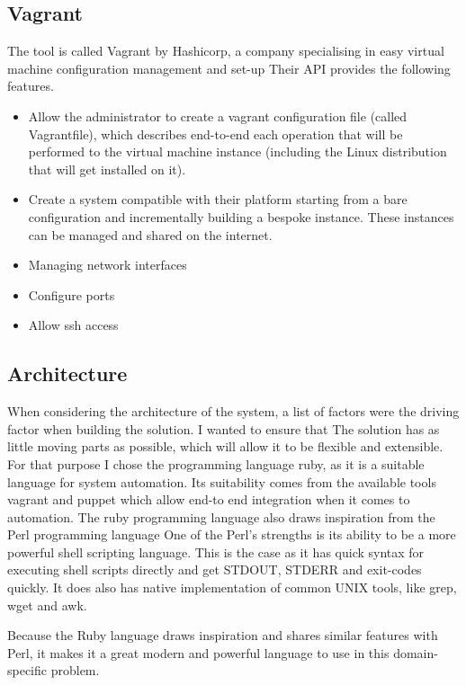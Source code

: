 \documentclass{article}
\begin{document}
\subsection{Vagrant}
The tool is called Vagrant by Hashicorp, a company specialising in easy virtual machine configuration management and set-up Their API provides the following features.

\begin{itemize}
	\item
	      Allow the administrator to create a \gls{vagrant} configuration file (called Vagrantfile), which describes end-to-end each operation that will be performed to the virtual machine instance (including the Linux distribution that will get installed on it).
	\item
	      Create a system compatible with their platform starting from a bare configuration and incrementally building a bespoke instance. These instances can be managed and shared on the internet.
	\item
	      Managing network interfaces
	\item
	      Configure ports
	\item
	      Allow \gls{ssh} access
\end{itemize}

\subsection{Architecture}
When considering the architecture of the system, a list of factors were the driving factor when building the solution. I wanted to ensure that The solution has as little moving parts as possible, which will allow it to be flexible and extensible. For that purpose I chose the programming language \gls{ruby}, as it is a suitable language for system automation. Its suitability comes from the available tools \gls{vagrant} and \gls{puppet} which allow end-to end integration when it comes to automation. The \gls{ruby} programming language also draws inspiration from the Perl programming language One of the Perl's strengths is its ability to be a more powerful shell scripting language. This is the case as it has quick syntax for executing shell scripts directly and get STDOUT, STDERR and exit-codes quickly. It does also has native implementation of common UNIX tools, like grep, wget and awk.

Because the Ruby language draws inspiration and shares similar features with Perl, it makes it a great modern and powerful language to use in this domain-specific problem.
\end{document}
